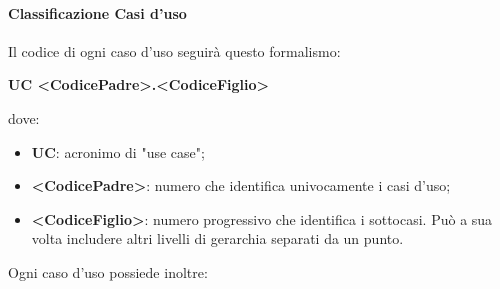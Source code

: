            \paragraph{Classificazione Casi d’uso}
                Il codice di ogni caso d'uso seguirà questo formalismo:
                \begin{center}
                    \textbf{UC <CodicePadre>.<CodiceFiglio>}
                \end{center}
                dove:
                \begin{itemize}
                    \item\textbf{UC}: acronimo di "use case";
                    \item\textbf{<CodicePadre>}: numero che identifica univocamente i casi d'uso;
                    \item\textbf{<CodiceFiglio>}: numero progressivo che identifica i sottocasi. Può a sua volta includere altri livelli di gerarchia separati da un punto.
                \end{itemize}
                Ogni caso d’uso possiede inoltre:
